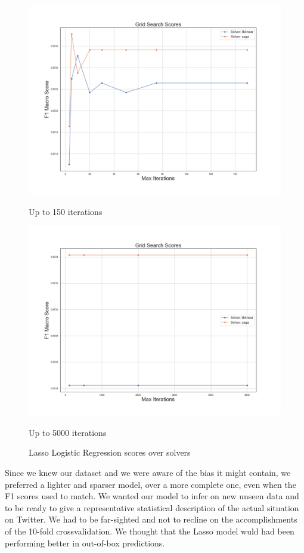 \begin{figure}
	\begin{multicols}{2}
		\includegraphics[width=\linewidth]{chapter5/figure/logreg_l1_close.png}\par 
		\caption{Up to 150 iterations}
		\label{fig:lr_lasso_close}
		\includegraphics[width=\linewidth]{chapter5/figure/logreg_l1_far.png}\par 
		\caption{Up to 5000 iterations}
		\label{fig:lr_lasso_far}
	\end{multicols}
	\caption{Lasso Logistic Regression scores over solvers}
\end{figure}

Since we knew our dataset and we were aware of the bias it might contain, we preferred a lighter and sparser model, over a more complete one, even when the F1 scores used to match. We wanted our model to infer on new unseen data and to be ready to give a representative statistical description of the actual situation on Twitter.
We had to be far-sighted and not to recline on the accomplishments of the 10-fold crossvalidation. We thought that the Lasso model wuld had been performing better in out-of-box predictions.

